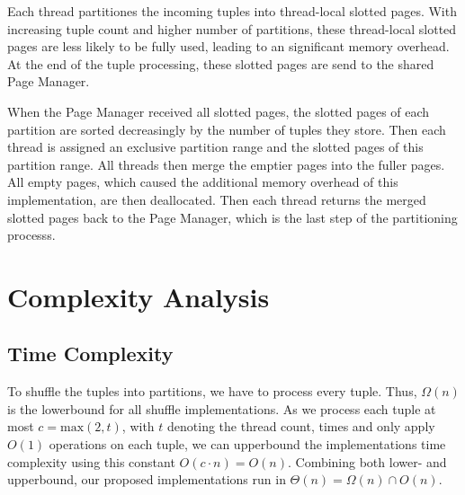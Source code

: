 Each thread partitiones the incoming tuples into thread-local slotted pages.
With increasing tuple count and higher number of partitions, these thread-local slotted pages are less likely to be fully used, leading to an significant memory overhead.
At the end of the tuple processing, these slotted pages are send to the shared Page Manager.

When the Page Manager received all slotted pages, the slotted pages of each partition are sorted decreasingly by the number of tuples they store.
Then each thread is assigned an exclusive partition range and the slotted pages of this partition range.
All threads then merge the emptier pages into the fuller pages.
All empty pages, which caused the additional memory overhead of this implementation, are then deallocated.
Then each thread returns the merged slotted pages back to the Page Manager, which is the last step of the partitioning processs.

\section{Complexity Analysis}
\subsection{Time Complexity}
To shuffle the tuples into partitions, we have to process every tuple.
Thus, $\Omega(n)$ is the lowerbound for all shuffle implementations.
As we process each tuple at most $c = \textrm{max}(2, t)$, with $t$ denoting the thread count, times and only apply $O(1)$ operations on each tuple, we can upperbound the implementations time complexity using this constant $O(c\cdot n) = O(n)$.
Combining both lower- and upperbound, our proposed implementations run in $\Theta(n) = \Omega(n) \cap O(n) $.
